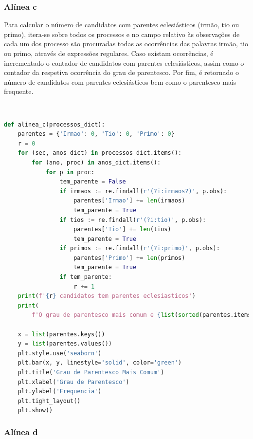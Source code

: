 \documentclass[a4paper, 11pt]{article}
\begin{document}
\pagebreak

\subsubsection{Alínea c}

Para calcular o número de candidatos com parentes eclesiásticos (irmão, tio ou primo), itera-se sobre
todos os processos e no campo relativo às observações de cada um dos processo são procuradas todas
as ocorrências das palavras irmão, tio ou primo, através de expressões regulares. Caso existam ocorrências,
é incrementado o contador de candidatos com parentes eclesiásticos, assim como o contador da respetiva
ocorrência do grau de parentesco. Por fim, é retornado o número de candidatos com parentes eclesiásticos
bem como o parentesco mais frequente.

\

\begin{lstlisting}[language=Python]
def alinea_c(processos_dict):
    parentes = {'Irmao': 0, 'Tio': 0, 'Primo': 0}
    r = 0
    for (sec, anos_dict) in processos_dict.items():
        for (ano, proc) in anos_dict.items():
            for p in proc:
                tem_parente = False
                if irmaos := re.findall(r'(?i:irmaos?)', p.obs):
                    parentes['Irmao'] += len(irmaos)
                    tem_parente = True
                if tios := re.findall(r'(?i:tio)', p.obs):
                    parentes['Tio'] += len(tios)
                    tem_parente = True
                if primos := re.findall(r'(?i:primo)', p.obs):
                    parentes['Primo'] += len(primos)
                    tem_parente = True
                if tem_parente:
                    r += 1
    print(f'{r} candidatos tem parentes eclesiasticos')
    print(
        f'O grau de parentesco mais comum e {list(sorted(parentes.items(), key=lambda item: item[1], reverse=True))[0][0]}')

    x = list(parentes.keys())
    y = list(parentes.values())
    plt.style.use('seaborn')
    plt.bar(x, y, linestyle='solid', color='green')
    plt.title('Grau de Parentesco Mais Comum')
    plt.xlabel('Grau de Parentesco')
    plt.ylabel('Frequencia')
    plt.tight_layout()
    plt.show()
\end{lstlisting}

\pagebreak

\subsubsection{Alínea d}
\end{document}
